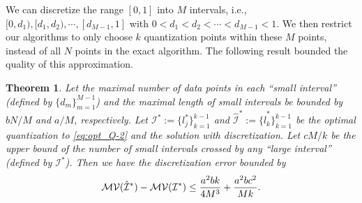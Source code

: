 \documentclass{article}
\newtheorem*{theorem*}{Theorem}
\begin{document}
We can discretize the range $[0,1]$ into $M$ intervals, i.e., $[0,d_1), [d_1, d_2), \cdots, [d_{M-1}, 1]$ with $0< d_1<d_2<\cdots < d_{M-1}<1$. We then restrict our algorithms to only choose $k$ quantization points within these $M$ points, instead of all $N$ points in the exact algorithm. The following result bounded the quality of this approximation.

\begin{theorem*} \label{thm:optQ-2}
Let the maximal number of data points in each ``small interval'' (defined by $\{d_m\}_{m=1}^{M-1}$) and the maximal length of small intervals be bounded by $bN/M$ and $a/M$, respectively. Let ${\mathcal{I}^*} := \{l^*_j\}_{k=1}^{k-1}$ and $\hat{\mathcal{I}}^* :=\{\hat{l}^*_k\}_{k=1}^{k-1}$ be the optimal quantization to \eqref{eq:opt_Q-2} and the solution with discretization. Let $cM/k$ be the upper bound of the number of small intervals crossed by any ``large interval'' (defined by ${\mathcal{I}}^*$). Then we have the discretization error bounded by
\[
 \mathcal{MV}(\hat{\mathcal{I}}^*) -  \mathcal{MV}({\mathcal{I}}^*) \leq {a^2b k \over 4 M^3} + {a^2bc^2 \over Mk}.
\]
\end{theorem*}
\end{document}
